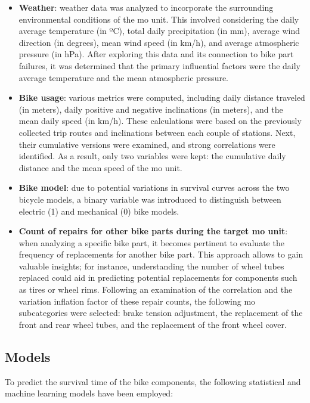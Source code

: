 \begin{itemize}
\item \textbf{Weather}: weather data was analyzed to incorporate the surrounding environmental conditions of the \ac{mo} unit. This involved considering the daily average temperature (in ºC), total daily precipitation (in mm), average wind direction (in degrees), mean wind speed (in km/h), and average atmospheric pressure (in hPa). After exploring this data and its connection to bike part failures, it was determined that the primary influential factors were the daily average temperature and the mean atmospheric pressure.
\item \textbf{Bike usage}: various metrics were computed, including daily distance traveled (in meters), daily positive and negative inclinations (in meters), and the mean daily speed (in km/h). These calculations were based on the previously collected trip routes and inclinations between each couple of stations. Next, their cumulative versions were examined, and strong correlations were identified. As a result, only two variables were kept: the cumulative daily distance and the mean speed of the \ac{mo} unit.
\item \textbf{Bike model}: due to potential variations in survival curves across the two bicycle models, a binary variable was introduced to distinguish between electric (1) and mechanical (0) bike models.
\item \textbf{Count of repairs for other bike parts during the target \ac{mo} unit}: when analyzing a specific bike part, it becomes pertinent to evaluate the frequency of replacements for another bike part. This approach allows to gain valuable insights; for instance, understanding the number of wheel tubes replaced could aid in predicting potential replacements for components such as tires or wheel rims. Following an examination of the correlation and the variation inflation factor of these repair counts, the following \ac{mo} subcategories were selected: brake tension adjustment, the replacement of the front and rear wheel tubes, and the replacement of the front wheel cover.
\end{itemize}

    \subsection{Models}
To predict the survival time of the bike components, the following statistical and machine learning models have been employed:

